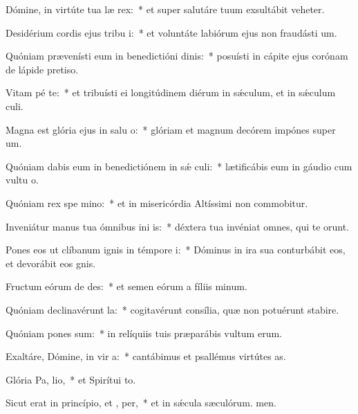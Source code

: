 \item Dómine, in virtúte tua læ rex:~* et super salutáre tuum exsultábit veheter.
\item Desidérium cordis ejus tribu i:~* et voluntáte labiórum ejus non fraudásti um.
\item Quóniam prævenísti eum in benedictióni dinis:~* posuísti in cápite ejus corónam de lápide pretiso.
\item Vitam pé  te:~* et tribuísti ei longitúdinem diérum in sǽculum, et in sǽculum culi.
\item Magna est glória ejus in salu o:~* glóriam et magnum decórem impónes super um.
\item Quóniam dabis eum in benedictiónem in sǽ culi:~* lætificábis eum in gáudio cum vultu o.
\item Quóniam rex spe  mino:~* et in misericórdia Altíssimi non commobitur.
\item Inveniátur manus tua ómnibus ini is:~* déxtera tua invéniat omnes, qui te orunt.
\item Pones eos ut clíbanum ignis in témpore  i:~* Dóminus in ira sua conturbábit eos, et devorábit eos gnis.
\item Fructum eórum de  des:~* et semen eórum a fíliis minum.
\item Quóniam declinavérunt   la:~* cogitavérunt consília, quæ non potuérunt stabire.
\item Quóniam pones  sum:~* in relíquiis tuis præparábis vultum erum.
\item Exaltáre, Dómine, in vir a:~* cantábimus et psallémus virtútes as.
\item Glória Pa,  lio,~* et Spirítui to.
\item Sicut erat in princípio, et ,  per,~* et in sǽcula sæculórum. men.
